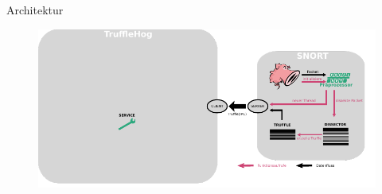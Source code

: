 \begin{frame}{Architektur}
    \begin{figure}
    	\centering
    	\includegraphics[width=\textwidth]{./images/8.pdf}
    \end{figure}
\end{frame}
